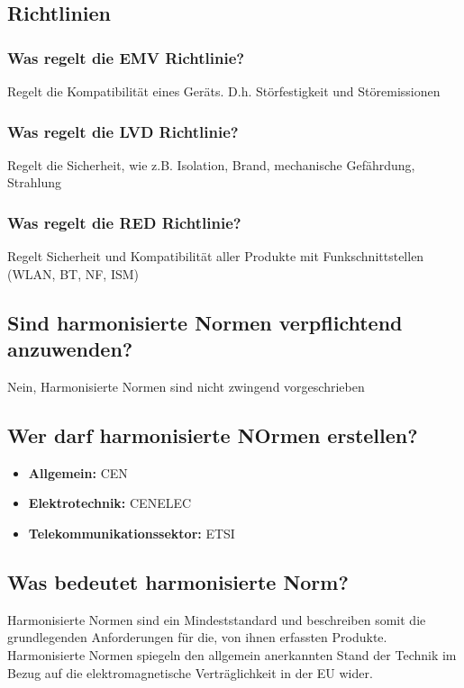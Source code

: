 \subsection{Richtlinien}
\subsubsection{Was regelt die EMV Richtlinie?}
Regelt die Kompatibilität eines Geräts. D.h. Störfestigkeit und Störemissionen

\subsubsection{Was regelt die LVD Richtlinie?}
Regelt die Sicherheit, wie z.B. Isolation, Brand, mechanische Gefährdung, Strahlung

\subsubsection{Was regelt die RED Richtlinie?}
Regelt Sicherheit und Kompatibilität aller Produkte mit Funkschnittstellen (WLAN, BT, NF, ISM)

\subsection{Sind harmonisierte Normen verpflichtend anzuwenden?}
Nein, Harmonisierte Normen sind nicht zwingend vorgeschrieben

\subsection{Wer darf harmonisierte NOrmen erstellen?}
\begin{itemize}
  \item \textbf{Allgemein:} CEN
  \item \textbf{Elektrotechnik:} CENELEC
  \item \textbf{Telekommunikationssektor:} ETSI
\end{itemize}

\subsection{Was bedeutet harmonisierte Norm?}
Harmonisierte Normen sind ein Mindeststandard und beschreiben somit die grundlegenden Anforderungen für die, von ihnen erfassten Produkte.\p
Harmonisierte Normen spiegeln den allgemein anerkannten Stand der Technik im Bezug auf die elektromagnetische Verträglichkeit in der EU wider.

